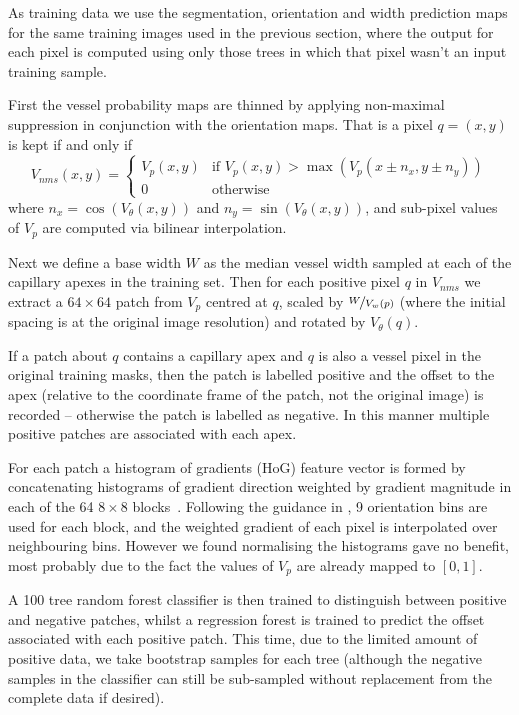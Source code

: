 \documentclass[runningheads,a4paper]{llncs}
\begin{document}
As training data we use the segmentation, orientation and width prediction maps for the same training images used in the previous section, where the output for each pixel is computed using only those trees in which that pixel wasn't an input training sample.

First the vessel probability maps are thinned by applying non-maximal suppression in conjunction with the orientation maps. That is a pixel $q = (x,y)$ is kept if and only if
%
\begin{equation}
V_{nms}(x,y) =
\begin{cases}
V_p(x,y)   & \mbox{if } V_p(x,y) > \max \left( V_p(x \pm n_x, y \pm n_y) \right) \\
0          & \mbox{otherwise }
\end{cases}
\label{e:nms}
\end{equation}
%
where $n_x = \cos(V_\theta(x,y))$ and $n_y = \sin(V_\theta(x,y))$, and sub-pixel values of $V_p$ are computed via bilinear interpolation.

Next we define a base width $W$ as the median vessel width sampled at each of the capillary apexes in the training set. Then for each positive pixel $q$ in $V_{nms}$ we extract a $64 \times 64$ patch from $V_p$ centred at $q$, scaled by $\nicefrac{W}{V_w(p)}$ (where the initial spacing is at the original image resolution) and rotated by $V_\theta(q)$.

If a patch about $q$ contains a capillary apex and $q$ is also a vessel pixel in the original training masks, then the patch is labelled positive and the offset to the apex (relative to the coordinate frame of the patch, not the original image) is recorded  -- otherwise the patch is labelled as negative. In this manner multiple positive patches are associated with each apex.

For each patch a histogram of gradients (HoG)  feature vector is formed by concatenating histograms of gradient direction weighted by gradient magnitude in each of the 64 $8 \times 8$ blocks~\cite{HoG}. Following the guidance in \cite{HoG}, 9 orientation bins are used for each block, and the weighted gradient of each pixel is interpolated over neighbouring bins. However we found normalising the histograms gave no benefit, most probably due to the fact the values of $V_p$ are already mapped to $[0, 1]$.

A 100 tree random forest classifier is then trained to distinguish between positive and negative patches, whilst a regression forest is trained to predict the offset associated with each positive patch. This time, due to the limited amount of positive data, we take bootstrap samples for each tree (although the negative samples in the classifier can still be sub-sampled without replacement from the complete data if desired).
\end{document}
